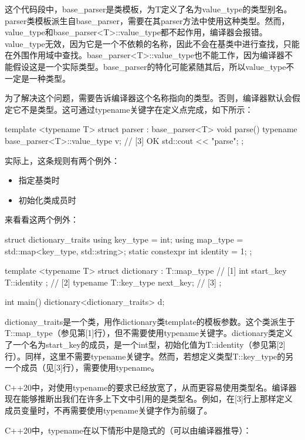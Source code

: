 这个代码段中，base_parser是类模板，为T定义了名为value_type的类型别名。parser类模板派生自base_parser，需要在其parser方法中使用这种类型。然而，value_type和base_parser<T>::value_type都不起作用，编译器会报错。value_type无效，因为它是一个不依赖的名称，因此不会在基类中进行查找，只能在外围作用域中查找。base_parser<T>::value_type也不能工作，因为编译器不能假设这是一个实际类型。base_parser的特化可能紧随其后，所以value_type不一定是一种类型。

为了解决这个问题，需要告诉编译器这个名称指向的类型。否则，编译器默认会假定它不是类型。这可通过typename关键字在定义点完成，如下所示：

\begin{cppcode}
template <typename T>
struct parser : base_parser<T>
{
	void parse()
	{
		typename base_parser<T>::value_type v{}; // [3] OK
		std::cout << "parse\n";
	}
};
\end{cppcode}

实际上，这条规则有两个例外：

\begin{itemize}
  \item 指定基类时
  \item 初始化类成员时
\end{itemize}

来看看这两个例外：

\begin{cppcode}
struct dictionary_traits
{
	using key_type = int;
	using map_type = std::map<key_type, std::string>;
	static constexpr int identity = 1;
};

template <typename T>
struct dictionary : T::map_type // [1]
{
	int start_key { T::identity }; // [2]
	typename T::key_type next_key; // [3]
};

int main()
{
	dictionary<dictionary_traits> d;
}
\end{cppcode}

dictionay_traits是一个类，用作dictionary类template的模板参数。这个类派生于T::map_type（参见第[1]行），但不需要使用typename关键字。dictionary类定义了一个名为start_key的成员，是一个int型，初始化值为T::identity（参见第[2]行）。同样，这里不需要typename关键字。然而，若想定义类型T::key_type的另一个成员（见[3]行），需要使用typename。

C++20中，对使用typename的要求已经放宽了，从而更容易使用类型名。编译器现在能够推断出我们在许多上下文中引用的是类型名。例如，在[3]行上那样定义成员变量时，不再需要使用typename关键字作为前缀了。

C++20中，typename在以下情形中是隐式的（可以由编译器推导）：

